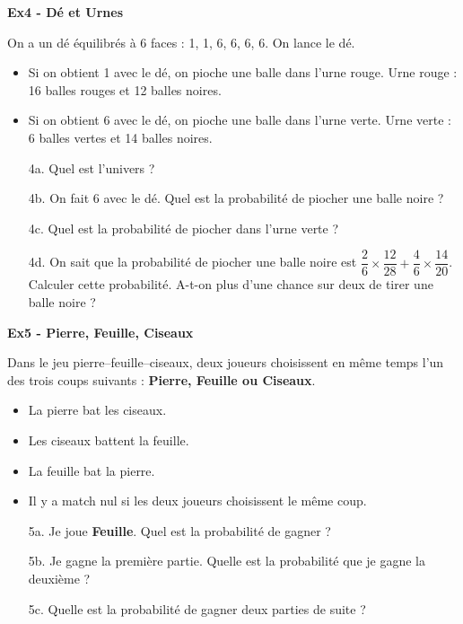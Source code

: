 \textbf{Ex4 - Dé et Urnes}

On a un dé équilibrés à 6 faces : 1, 1, 6, 6, 6, 6. On lance le dé. 

\begin{multicols}{2}\noindent
\begin{itemize}[label={$\bullet$}]
  \item Si on obtient 1 avec le dé, on pioche une balle dans l'urne rouge.
  Urne rouge : 16 balles rouges et 12 balles noires.

  \item Si on obtient 6 avec le dé, on pioche une balle dans l'urne verte.
  Urne verte : 6 balles vertes et 14 balles noires.
\end{itemize}
\end{multicols}

\begin{enumerate}
  \item[4a.] Quel est l'univers ? \\ \Pointilles[2] 
  \item[4b.] On fait 6 avec le dé. Quel est la probabilité de piocher une balle noire ? \\ \Pointilles[2] 
  \item[4c.] Quel est la probabilité de piocher dans l'urne verte ? \\ \Pointilles[2] 
  \item[4d.] On sait que la probabilité de piocher une balle noire est $\dfrac{2}{6} \times \dfrac{12}{28} + \dfrac{4}{6} \times \dfrac{14}{20}$. \\
  Calculer cette probabilité. A-t-on plus d'une chance sur deux de tirer une balle noire ? \\ \Pointilles[3] 
\end{enumerate}

\textbf{Ex5 - Pierre, Feuille, Ciseaux}

Dans le jeu pierre–feuille–ciseaux, deux joueurs choisissent en même temps l’un des trois coups suivants : \textbf{Pierre, Feuille ou Ciseaux}.

\begin{itemize}[label={$\bullet$}]
  \item La pierre bat les ciseaux.
  \item Les ciseaux battent la feuille. 
  \item La feuille bat la pierre.
  \item Il y a match nul si les deux joueurs choisissent le même coup.
\end{itemize}

\begin{enumerate}
  \item[5a.] Je joue \textbf{Feuille}. Quel est la probabilité de gagner ? \\ \Pointilles[2] 
  \item[5b.] Je gagne la première partie. Quelle est la probabilité que je gagne la deuxième ? \\ \Pointilles[4] 
  \item[5c.] Quelle est la probabilité de gagner deux parties de suite ? \\ \Pointilles[4] 
\end{enumerate}

